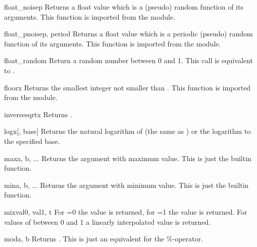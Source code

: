 \begin{funcdesc}{float_noise}{p}
Returns a float value which is a (pseudo) random function of its
arguments. This function is imported from the  module.
\end{funcdesc}

\begin{funcdesc}{float_pnoise}{p, period}
Returns a float value which is a periodic (pseudo) random function of
its arguments. This function is imported from the  module.
\end{funcdesc}

\begin{funcdesc}{float_random}{}
Return a random number between 0 and 1. This call is equivalent to
.
\end{funcdesc}

\begin{funcdesc}{floor}{x}
Returns the smallest integer not smaller than . This function is
imported from the  module.
\end{funcdesc}

\begin{funcdesc}{inversesqrt}{x}
Returns .
\end{funcdesc}

\begin{funcdesc}{log}{x[, base]}
Returns the natural logarithm of  (the same as
) or the logarithm to the specified base.
\end{funcdesc}

\begin{funcdesc}{max}{a, b, ...}
Returns the argument with maximum value. This is just the builtin
 function.
\end{funcdesc}

\begin{funcdesc}{min}{a, b, ...}
Returns the argument with minimum value. This is just the builtin 
 function.
\end{funcdesc}

\begin{funcdesc}{mix}{val0, val1, t}
For =0 the value  is returned, for =1 the value 
 is returned. For values of  between 0 and 1 a linearly 
interpolated value is returned.
\end{funcdesc}

\begin{funcdesc}{mod}{a, b}
Returns . This is just an equivalent for the \%-operator.
\end{funcdesc}

